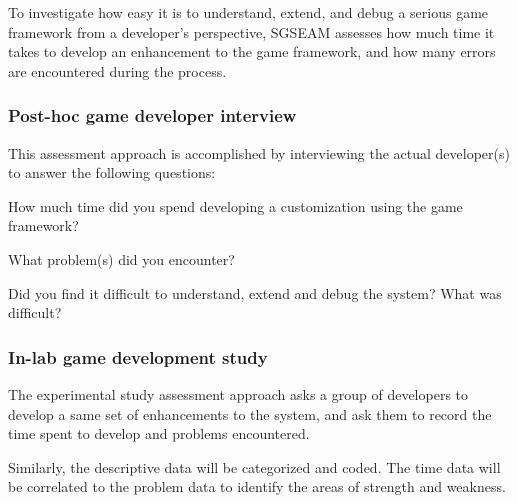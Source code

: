 \documentclass[11pt]{article}
\begin{document}
To investigate how easy it is to understand, extend, and debug a serious game
framework from a developer's perspective, SGSEAM assesses how much time it takes to develop an
enhancement to the game framework, and how many errors are encountered
during the process.

\subsubsection{Post-hoc game developer interview}
\label{Post-hoc game developer interview}

This assessment approach is accomplished by interviewing the actual developer(s) to
answer the following questions:\\
 
\begin{compactitem}
\item How much time did you spend developing a customization using the game framework?
\item What problem(s) did you encounter?
\item Did you find it difficult to understand, extend and debug the system? What was difficult?\\
\end{compactitem}

\subsubsection{In-lab game development study}
\label{In-lab game development study}

The experimental study assessment approach asks a group of developers to develop a same set of
enhancements to the system, and ask them to record the time spent to develop and problems
encountered.

Similarly, the descriptive data will be categorized and coded. The time data will be correlated to the problem data to identify the areas of strength and weakness.



\end{document}

